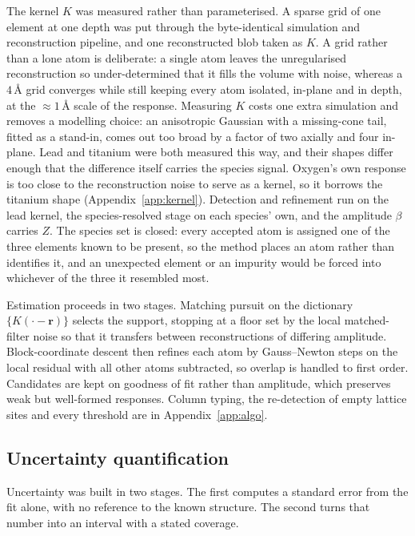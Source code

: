 \documentclass[aps,prb,twocolumn,superscriptaddress,floatfix,nofootinbib]{revtex4-2}
\begin{document}
The kernel $K$ was measured rather than parameterised. A sparse grid of one element at one depth was put through the byte-identical simulation and reconstruction pipeline, and one reconstructed blob taken as $K$. A grid rather than a lone atom is deliberate: a single atom leaves the unregularised reconstruction so under-determined that it fills the volume with noise, whereas a $4$\,\AA{} grid converges while still keeping every atom isolated, in-plane and in depth, at the ${\approx}1$\,\AA{} scale of the response. Measuring $K$ costs one extra simulation and removes a modelling choice: an anisotropic Gaussian with a missing-cone tail, fitted as a stand-in, comes out too broad by a factor of two axially and four in-plane. Lead and titanium were both measured this way, and their shapes differ enough that the difference itself carries the species signal. Oxygen's own response is too close to the reconstruction noise to serve as a kernel, so it borrows the titanium shape (Appendix~\ref{app:kernel}). Detection and refinement run on the lead kernel, the species-resolved stage on each species' own, and the amplitude $\beta$ carries $Z$. The species set is closed: every accepted atom is assigned one of the three elements known to be present, so the method places an atom rather than identifies it, and an unexpected element or an impurity would be forced into whichever of the three it resembled most.

Estimation proceeds in two stages. Matching pursuit on the dictionary $\{K(\cdot-\mathbf{r})\}$ \citep{MallatZhang1993} selects the support, stopping at a floor set by the local matched-filter noise so that it transfers between reconstructions of differing amplitude. Block-coordinate descent then refines each atom by Gauss--Newton steps on the local residual with all other atoms subtracted, so overlap is handled to first order. Candidates are kept on goodness of fit rather than amplitude, which preserves weak but well-formed responses. Column typing, the re-detection of empty lattice sites and every threshold are in Appendix~\ref{app:algo}.

\subsection{Uncertainty quantification}
\label{sec:uq}

Uncertainty was built in two stages. The first computes a standard error from the fit alone, with no reference to the known structure. The second turns that number into an interval with a stated coverage.
\end{document}
